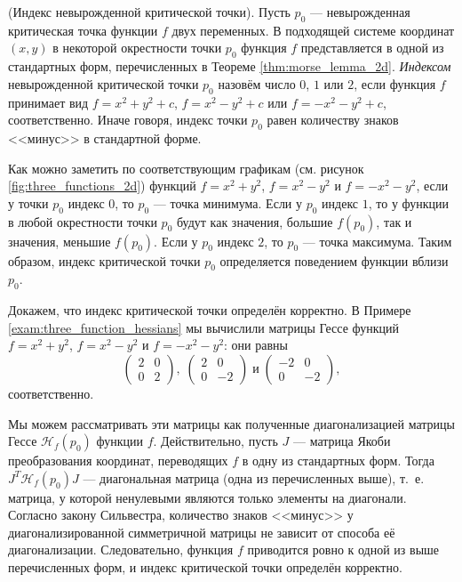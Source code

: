 \documentclass[a4paper,12pt,openany,leqno]{extbook}
\begin{document}
\begin{definition} (Индекс невырожденной критической точки). Пусть $p_0$ --- невырожденная критическая точка функции $f$ двух переменных. В подходящей системе координат $(x, y)$ в некоторой окрестности точки $p_0$ функция $f$ представляется в одной из стандартных форм, перечисленных в Теореме \ref{thm:morse_lemma_2d}. \emph{Индексом} невырожденной критической точки $p_0$ назовём число $0$, $1$ или $2$, если функция $f$ принимает вид $f = x^2 + y^2 + c$, $f = x^2 - y^2 + c$ или $f = -x^2 - y^2 + c$, соответственно. Иначе говоря, индекс точки $p_0$ равен количеству знаков <<минус>> в стандартной форме.
\end{definition}
    
Как можно заметить по соответствующим графикам (см. рисунок \ref{fig:three_functions_2d}) функций $f = x^2 + y^2$, $f = x^2 - y^2$ и $f = -x^2 - y^2$, если у точки $p_0$ индекс $0$, то $p_0$ --- точка минимума. Если у $p_0$ индекс $1$, то у функции в любой окрестности точки $p_0$ будут как значения, большие $f(p_0)$, так и значения, меньшие $f(p_0)$. Если у $p_0$ индекс $2$, то $p_0$ --- точка максимума. Таким образом, индекс критической точки $p_0$ определяется поведением функции вблизи $p_0$.

Докажем, что индекс критической точки определён корректно. В Примере \ref{exam:three_function_hessians} мы вычислили матрицы Гессе функций $f = x^2 + y^2$, $f = x^2 - y^2$ и $f = -x^2 - y^2$: они равны
    \[
    \left(
  \begin{array}{cc}
    2 & 0\\
    0 & 2
  \end{array}
    \right),\;
    \left(
  \begin{array}{cc}
    2 & 0\\
    0 & -2
  \end{array}
    \right)\;\text{и}\;
    \left(
  \begin{array}{cc}
    -2 & 0\\
    0 & -2
  \end{array}
    \right),
    \]
соответственно.

Мы можем рассматривать эти матрицы как полученные диагонализацией матрицы Гессе $\mathcal{H}_f(p_0)$ функции $f$. Действительно, пусть $J$ --- матрица Якоби преобразования координат, переводящих $f$ в одну из стандартных форм. Тогда $J^T \mathcal{H}_f(p_0) J$ --- диагональная матрица (одна из перечисленных выше), т.~е. матрица, у которой ненулевыми являются только элементы на диагонали. Согласно закону Сильвестра, количество знаков <<минус>> у диагонализированной симметричной матрицы не зависит от способа её диагонализации. Следовательно, функция $f$ приводится ровно к одной из выше перечисленных форм, и индекс критической точки определён корректно.
\end{document}
